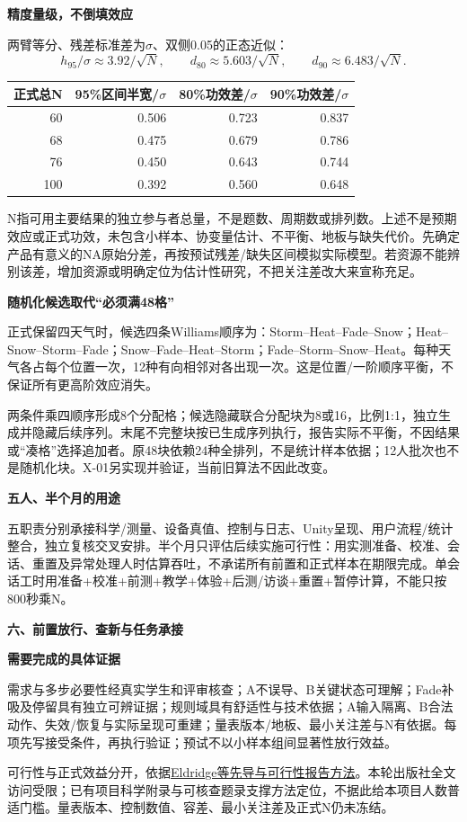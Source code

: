 \documentclass[11pt,a4paper]{article}
\newcommand{\reviewsection}[1]{\par\Needspace{6\baselineskip}\begin{center}{\titlelatin\titlecjk\bfseries\fontsize{14}{20}\selectfont #1}\end{center}}
\newcommand{\reviewsubsection}[1]{\par\Needspace{4\baselineskip}\begin{center}{\titlelatin\titlecjk\bfseries\fontsize{12}{18}\selectfont #1}\end{center}}
\begin{document}
\reviewsubsection{5.2 精度量级，不倒填效应}
两臂等分、残差标准差为$\sigma$、双侧0.05的正态近似：
\[h_{95}/\sigma\approx3.92/\sqrt N,\qquad d_{80}\approx5.603/\sqrt N,\qquad d_{90}\approx6.483/\sqrt N.\]
\begin{center}\begin{tabular}{rrrr}\hline
正式总N & 95\%区间半宽/$\sigma$ & 80\%功效差/$\sigma$ & 90\%功效差/$\sigma$\\\hline
60 & 0.506 & 0.723 & 0.837\\
68 & 0.475 & 0.679 & 0.786\\
76 & 0.450 & 0.643 & 0.744\\
100 & 0.392 & 0.560 & 0.648\\\hline
\end{tabular}\end{center}
N指可用主要结果的独立参与者总量，不是题数、周期数或排列数。上述不是预期效应或正式功效，未包含小样本、协变量估计、不平衡、地板与缺失代价。先确定产品有意义的NA原始分差，再按预试残差/缺失区间模拟实际模型。若资源不能辨别该差，增加资源或明确定位为估计性研究，不把关注差改大来宣称充足。

\reviewsubsection{5.3 随机化候选取代“必须满48格”}
正式保留四天气时，候选四条Williams顺序为：Storm--Heat--Fade--Snow；Heat--Snow--Storm--Fade；Snow--Fade--Heat--Storm；Fade--Storm--Snow--Heat。每种天气各占每个位置一次，12种有向相邻对各出现一次。这是位置/一阶顺序平衡，不保证所有更高阶效应消失。

两条件乘四顺序形成8个分配格；候选隐藏联合分配块为8或16，比例1:1，独立生成并隐藏后续序列。末尾不完整块按已生成序列执行，报告实际不平衡，不因结果或“凑格”选择追加者。原48块依赖24种全排列，不是统计样本依据；12人批次也不是随机化块。X-01另实现并验证，当前旧算法不因此改变。

\reviewsubsection{5.4 五人、半个月的用途}
五职责分别承接科学/测量、设备真值、控制与日志、Unity呈现、用户流程/统计整合，独立复核交叉安排。半个月只评估后续实施可行性：用实测准备、校准、会话、重置及异常处理人时估算吞吐，不承诺所有前置和正式样本在期限完成。单会话工时用准备+校准+前测+教学+体验+后测/访谈+重置+暂停计算，不能只按800秒乘N。

\newpage\reviewsection{六、前置放行、查新与任务承接}
\reviewsubsection{6.1 需要完成的具体证据}
需求与多步必要性经真实学生和评审核查；A不误导、B关键状态可理解；Fade补吸及停留具有独立可辨证据；规则域具有舒适性与技术依据；A输入隔离、B合法动作、失效/恢复与实际呈现可重建；量表版本/地板、最小关注差与N有依据。每项先写接受条件，再执行验证；预试不以小样本组间显著性放行效益。

可行性与正式效益分开，依据\href{https://doi.org/10.1136/bmj.i5239}{Eldridge等先导与可行性报告方法}。本轮出版社全文访问受限；已有项目科学附录与可核查题录支撑方法定位，不据此给本项目人数普适门槛。量表版本、控制数值、容差、最小关注差及正式N仍未冻结。
\end{document}
